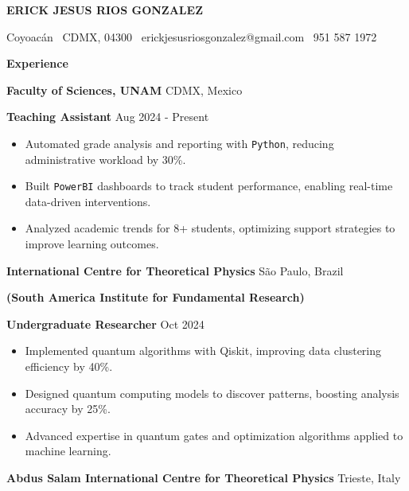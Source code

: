 \documentclass[6pt]{article}
\begin{document}
\begin{center}
    \textbf{ERICK JESUS RIOS GONZALEZ}\\ 
    \hrulefill
\end{center}

\begin{center}
    Coyoacán \textbullet \ CDMX, 04300 \textbullet \ erickjesusriosgonzalez@gmail.com \textbullet \  951 587 1972
\end{center}

\vspace{0.5pt}

\begin{center}
    \textbf{Experience}
\end{center}
\textbf{Faculty of Sciences, UNAM} \hfill CDMX, Mexico

\textbf{Teaching Assistant} \hfill Aug 2024 - Present
\begin{itemize}[noitemsep, topsep=0pt, partopsep=0pt, parsep=0pt]
    \item Automated grade analysis and reporting with \texttt{Python}, reducing administrative workload by 30\%.
    \item Built \texttt{PowerBI} dashboards to track student performance, enabling real-time data-driven interventions.
    \item Analyzed academic trends for 8+ students, optimizing support strategies to improve learning outcomes.
\end{itemize}
\vspace{5pt}
\textbf{International Centre for Theoretical Physics } \hfill São Paulo, Brazil 

\textbf{(South America Institute for Fundamental Research)}

\textbf{Undergraduate Researcher} \hfill Oct 2024
\begin{itemize}[noitemsep, topsep=0pt, partopsep=0pt, parsep=0pt]
    \item Implemented quantum algorithms with Qiskit, improving data clustering efficiency by 40\%.
    \item Designed quantum computing models to discover patterns, boosting analysis accuracy by 25\%.
    \item Advanced expertise in quantum gates and optimization algorithms applied to machine learning.
\end{itemize}
\vspace{5pt}
\textbf{Abdus Salam International Centre for Theoretical Physics} \hfill Trieste, Italy
\end{document}
